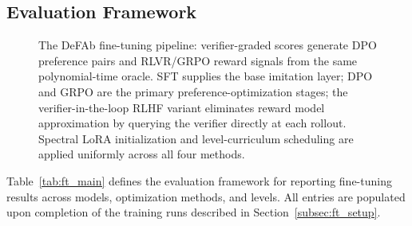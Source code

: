 \documentclass{article}
\theoremstyle{definition}
\begin{document}
\subsection{Evaluation Framework}\label{subsec:ft_results}

\begin{figure}[h]
\centering
\resizebox{\textwidth}{!}{}
\caption{The DeFAb fine-tuning pipeline: verifier-graded scores generate DPO preference pairs and RLVR/GRPO reward signals from the same polynomial-time oracle. SFT supplies the base imitation layer; DPO and GRPO are the primary preference-optimization stages; the verifier-in-the-loop RLHF variant eliminates reward model approximation by querying the verifier directly at each rollout. Spectral LoRA initialization and level-curriculum scheduling are applied uniformly across all four methods.}
\label{fig:finetuning}
\end{figure}

Table~\ref{tab:ft_main} defines the evaluation framework for reporting fine-tuning results across models, optimization methods, and levels. All entries are populated upon completion of the training runs described in Section~\ref{subsec:ft_setup}.
\end{document}
